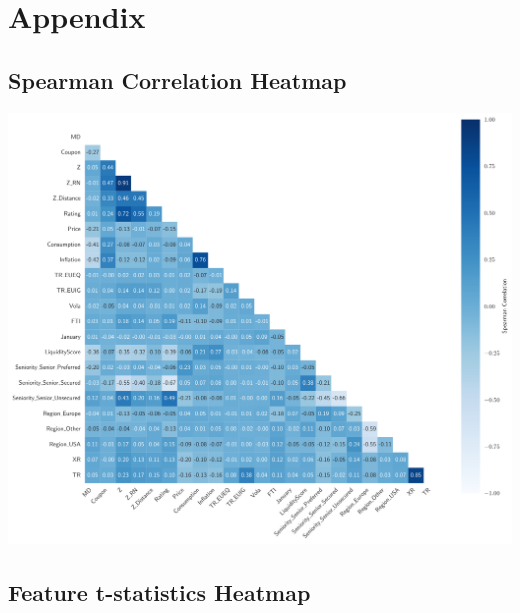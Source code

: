 \chapter{Appendix}

\section{Spearman Correlation Heatmap}

\begin{center}
\begin{minipage}{\textwidth}
    \centering
    \includegraphics[width=\textwidth]{images/correlation_heatmap.pdf}
    \label{fig:correlation_heatmap}
\end{minipage}
\end{center}

\section{Feature t-statistics Heatmap}

\vspace{1em}


